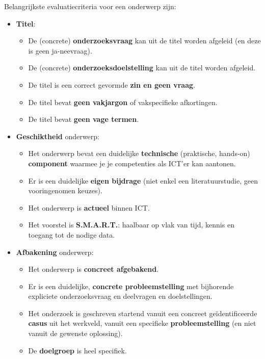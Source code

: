 Belangrijkste evaluatiecriteria voor een onderwerp zijn:


\begin{itemize}
  \item \textbf{Titel}:
  \begin{itemize}
    \item De (concrete) \textbf{onderzoeksvraag} kan uit de titel worden afgeleid (en deze is geen ja-neevraag).
    \item De (concrete) \textbf{onderzoeksdoelstelling} kan uit de titel worden afgeleid.
    \item De titel is een correct gevormde \textbf{zin en geen vraag}.
    \item De titel bevat \textbf{geen vakjargon} of vakspecifieke afkortingen.
    \item De titel bevat \textbf{geen vage termen}.
  \end{itemize}
  \item \textbf{Geschiktheid} onderwerp:
  \begin{itemize}
    \item Het onderwerp bevat een duidelijke \textbf{technische} (praktische, hands-on) \textbf{component} waarmee je je competenties als ICT'er kan aantonen. 
    \item Er is een duidelijke \textbf{eigen bijdrage} (niet enkel een literatuurstudie, geen vooringenomen keuzes). 
    \item Het onderwerp is \textbf{actueel} binnen ICT.
    \item Het voorstel is \textbf{S.M.A.R.T.}: haalbaar op vlak van tijd, kennis en toegang tot de nodige data.
  \end{itemize}
  \item \textbf{Afbakening} onderwerp:
  \begin{itemize}
    \item Het onderwerp is \textbf{concreet afgebakend}. 
    \item Er is een duidelijke, \textbf{concrete probleemstelling} met bijhorende explicie\-te onderzoeksvraag en deelvragen en doelstellingen.
    \item Het onderzoek is geschreven startend vanuit een concreet geïdentificeer\-de \textbf{casus} uit het werkveld, vanuit een specifieke \textbf{probleemstelling} (en niet vanuit de gewenste oplossing).
    \item De \textbf{doelgroep} is heel specifiek. 
  \end{itemize}
\end{itemize}


